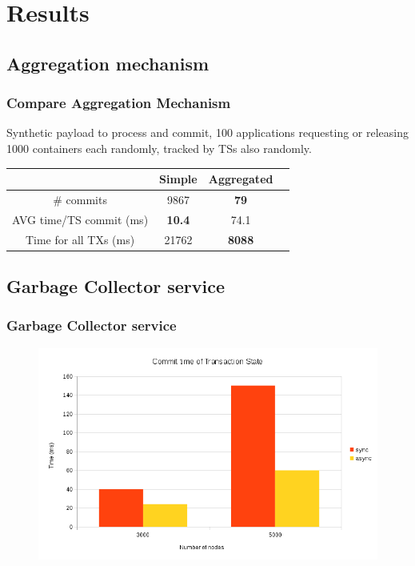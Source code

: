 \documentclass{beamer}
\begin{document}
\section{Results}
\subsection{Aggregation mechanism}
\begin{frame}
\frametitle{Compare Aggregation Mechanism}
Synthetic payload to process and commit, 100 applications requesting or releasing
1000 containers each randomly, tracked by TSs also randomly. \\[2em]

\centering
\begin{tabular}{| c | c | c | c |}
\hline
  & Simple & Aggregated \\
\hline
\# commits & 9867 & \textbf{79} \\
\hline
AVG time/TS commit (ms) & \textbf{10.4} & 74.1 \\
\hline
Time for all TXs (ms) & 21762 & \textbf{8088} \\
\hline
\end{tabular}
\end{frame}

\subsection{Garbage Collector service}
\begin{frame}
\frametitle{Garbage Collector service}
\begin{figure}
\centering
  \includegraphics[scale=0.5]{resources/async_commit_time.png}
\end{figure}
\end{frame}
\end{document}
